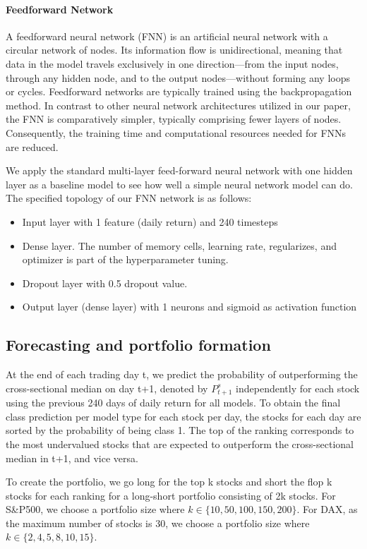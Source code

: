 \documentclass{article}
\begin{document}
 
\paragraph{Feedforward Network}
A feedforward neural network (FNN) is an artificial neural network with a circular network of nodes. Its information flow is unidirectional, meaning that data in the model travels exclusively in one direction—from the input nodes, through any hidden node, and to the output nodes—without forming any loops or cycles. Feedforward networks are typically trained using the backpropagation method. In contrast to other neural network architectures utilized in our paper, the FNN is comparatively simpler, typically comprising fewer layers of nodes. Consequently, the training time and computational resources needed for FNNs are reduced. 

We apply the standard multi-layer feed-forward neural network with one hidden layer as a baseline model to see how well a simple neural network model can do. The specified topology of our FNN network is as follows:
\begin{itemize}
  \item Input layer with 1 feature (daily return) and 240 timesteps
  \item Dense layer. The number of memory cells, learning rate, regularizes, and optimizer is part of the hyperparameter tuning. 
  \item Dropout layer with 0.5 dropout value.
  \item Output layer (dense layer) with 1 neurons and sigmoid as activation function
\end{itemize}

\subsection{Forecasting and portfolio formation}
At the end of each trading day t, we predict the probability of outperforming the cross-sectional median on day t+1, denoted by $P^{s}_{t+1}$ independently for each stock using the previous 240 days of daily return for all models. To obtain the final class prediction per model type for each stock per day, the stocks for each day are sorted by the probability of being class 1. The top of the ranking corresponds to the most undervalued stocks that are expected to outperform the cross-sectional median in t+1, and vice versa.

To create the portfolio, we go long for the top k stocks and short the flop k stocks for each ranking for a long-short portfolio consisting of 2k stocks. For S\&P500, we choose a portfolio size where ${k \in \{10, 50, 100, 150, 200\}}$. For DAX, as the maximum number of stocks is 30, we choose a portfolio size where ${k \in \{2, 4, 5, 8, 10, 15\}}$.
\end{document}
